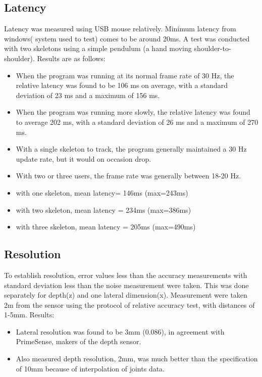 \documentclass[a4paper,10pt]{report}
\begin{document}
\subsection{Latency}
Latency was measured using USB mouse relatively. Minimum latency from windows( system used to test) comes to be around 20ms. A test was conducted with two skeletons using a simple pendulum (a hand moving shoulder-to-shoulder). \newline
Results are as follows:
\begin{itemize}
\item When the program was running at its normal frame rate of 30 Hz, the relative latency was found to be 106 ms on average, with a standard deviation of 23 ms and a maximum of 156 ms. 
\item When the program was running more slowly, the relative latency was found to average 202 ms, with a standard deviation of 26 ms and a maximum of 270 ms. 
\item With a single skeleton to track, the program generally maintained a 30 Hz update rate, but it would on occasion drop. 
\item With two or three users, the frame rate was generally between 18-20 Hz.
 \item with one skeleton, mean latency= 146ms (max=243ms)
 \item with two skeleton, mean latency = 234ms (max=386ms) 
 \item with three skeleton, mean latency = 205ms (max=490ms)
\end{itemize}

\subsection{Resolution}
To establish resolution, error values less than the accuracy measurements with standard deviation less than the noise measurement were taken. This was done separately for depth(z) and one lateral dimension(x). Measurement were taken 2m from the sensor using the protocol of relative accuracy test, with distances of 1-5mm.\newline
Results:
\begin{itemize}
 \item Lateral resolution was found to be 3mm (0.086\textdegree), in agreement with PrimeSense, makers of the depth sensor. 
 \item Also measured depth resolution, 2mm, was much better than the specification of 10mm because of interpolation of joints data.
\end{itemize}
\end{document}
